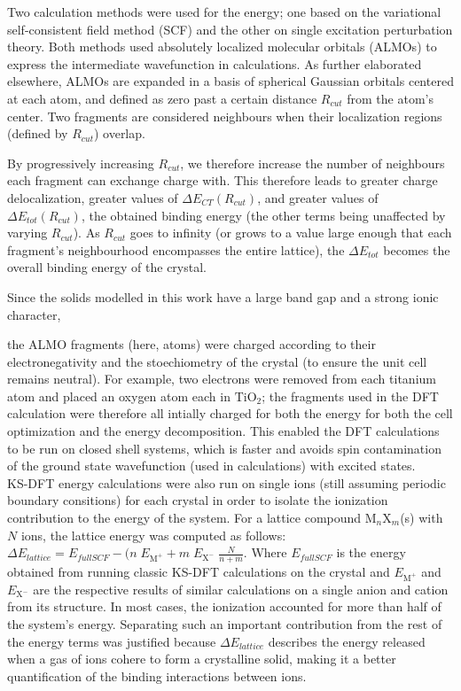 \documentclass[aps,prb,twocolumn,amsmath,amssymb,superscriptaddress,longbibliography]{revtex4-1}
\begin{document}
Two calculation methods were used for the energy; one based on the variational self-consistent field method (SCF) and the other on single excitation perturbation theory\cite{xpt}. 
Both methods used absolutely localized molecular orbitals (ALMOs) to express the intermediate wavefunction in calculations. 
As further elaborated elsewhere, ALMOs are expanded in a basis of spherical Gaussian orbitals centered at each atom, and defined as zero past a certain distance $R_{cut}$ from the atom's center. 
Two fragments are considered neighbours when their localization regions (defined by $R_{cut}$) overlap.

By progressively increasing $R_{cut}$, we therefore increase the number of neighbours each fragment can exchange charge with. 
This therefore leads to greater charge delocalization, greater values of $\Delta E_{CT}\left(R_{cut}\right)$, and greater values of $\Delta E_{tot}\left(R_{cut}\right)$, the obtained binding energy (the other terms being unaffected by varying $R_{cut}$). 
As $R_{cut}$ goes to infinity (or grows to a value large enough that each fragment's neighbourhood encompasses the entire lattice), the $\Delta E_{tot}$ becomes the overall binding energy of the crystal.

Since the solids modelled in this work have a large band gap and a strong ionic character, 

the ALMO fragments (here, atoms) were charged according to their electronegativity and the stoechiometry of the crystal (to ensure the unit cell remains neutral). 
For example, two electrons were removed from each titanium atom and placed an oxygen atom each in $\text{TiO}_{2}$; the fragments used in the DFT calculation were therefore all intially charged for both the energy for both the cell optimization and the energy decomposition. 
This enabled the DFT calculations to be run on closed shell systems, which is faster and avoids spin contamination of the ground state wavefunction (used in calculations) with excited states.\\


KS-DFT energy calculations were also run on single ions (still assuming periodic boundary consitions) for each crystal in order to isolate the ionization contribution to the energy of the system. 
For a lattice compound $\text{M}_{n}\text{X}_{m}$(s) with $N$ ions, the lattice energy was computed as follows: $\Delta E_{lattice} = E_{full SCF} - (n\; E_{\text{M}^{+}} + m\; E_{\text{X}^{-}}\;\frac{N}{n+m}$. 
Where $E_{full SCF}$ is the energy obtained from running classic KS-DFT calculations on the crystal and $E_{\text{M}^{+}}$ and $E_{\text{X}^{-}}$ are the respective results of similar calculations on a single anion and cation from its structure. 
In most cases, the ionization accounted for more than half of the system's energy. 
Separating such an important contribution from the rest of the energy terms was justified because $\Delta E_{lattice}$ describes the energy released when a gas of ions cohere to form a crystalline solid, making it a better quantification of the binding interactions between ions.
\end{document}
